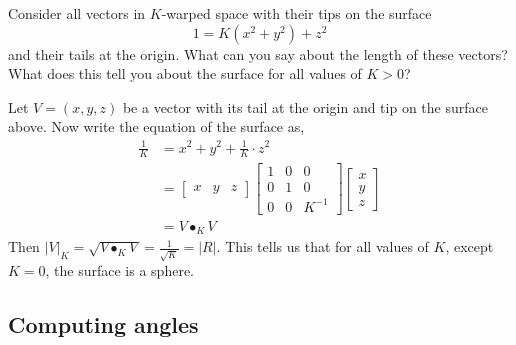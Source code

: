\documentclass[newpage,hints,handout]{ximera}
\begin{document}
\begin{problem}
  Consider all vectors in $K$-warped space with their tips on the surface
  \[
  1=K(x^2+y^2)+z^2
  \]
  and their tails at the origin. What can you say about the length of these
  vectors? What does this tell you about the surface for all values of $K>0$?
  
\begin{freeResponse}
Let $V = \left(x,y,z\right)$ be a vector with its tail at the origin and tip on the surface above. Now write the equation of the surface as,
\begin{align*}
\frac{1}{K} &= x^{2} + y^{2} + \frac{1}{K} \cdot z^{2} \\
&= \begin{bmatrix}
	x & y & z
	\end{bmatrix}
\begin{bmatrix}
	1 & 0 & 0 \\
	0 & 1 & 0 \\
	0 & 0 & K^{-1}
	\end{bmatrix}
\begin{bmatrix}
	x \\
	y \\
	z
	\end{bmatrix}\\
&= V \bullet_{K} V
\end{align*}
Then $|V|_{K} = \sqrt{V \bullet_{K} V} = \frac{1}{\sqrt{K}} = |R|$. This tells us that for all values of $K$, except $K=0$, the surface is a sphere. 
\end{freeResponse}

\end{problem}



\subsection{Computing angles}
\end{document}
